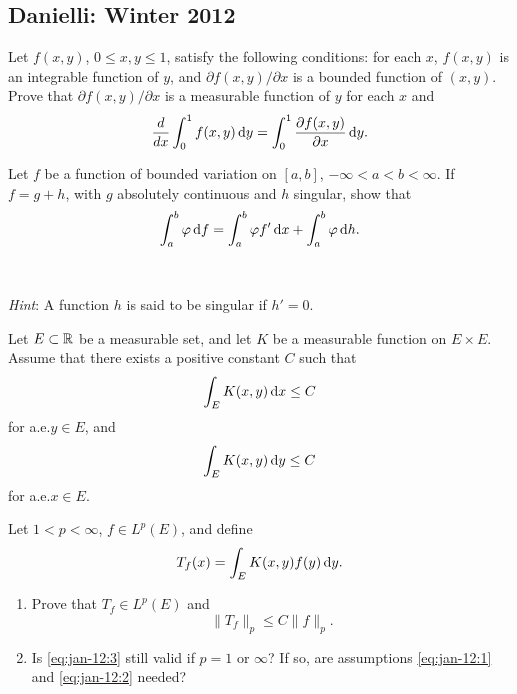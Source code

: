 \setcounter{exercise}{0}
\subsection{Danielli: Winter 2012}
\begin{problem}
Let $f(x,y)$, $0\leq x,y\leq 1$, satisfy the following conditions: for each
$x$, $f(x,y)$ is an integrable function of $y$, and $\partial
f(x,y)/\partial x$ is a bounded function of $(x,y)$. Prove that $\partial
f(x,y)/\partial x$ is a measurable function of $y$ for each $x$ and
\[
\frac{d}{dx}\int_0^1f(x,y)\mathop{}\!\mathrm{d} y=
\int_0^1\frac{\partial f(x,y)}{\partial x}\mathop{}\!\mathrm{d} y.
\]
\end{problem}
\begin{solution}
\end{solution}

\begin{problem}
Let $f$ be a function of bounded variation on $[a,b]$,
$-\infty<a<b<\infty$. If $f=g+h$, with $g$ absolutely continuous and $h$
singular, show that
\[
\int_a^b\varphi\mathop{}\!\mathrm{d} f=\int_a^b\varphi f'\mathop{}\!\mathrm{d} x+\int_a^b\varphi\mathop{}\!\mathrm{d} h.
\]
\\\\
\emph{Hint}: A function $h$ is said to be singular if $h'=0$.
\end{problem}
\begin{solution}
\end{solution}

\begin{problem}
Let $E\subset\mathbb{R}$ be a measurable set, and let $K$ be a measurable
function on $E\times E$. Assume that there exists a positive constant $C$
such that
\begin{equation}
\label{eq:jan-12:1}
\int_E K(x,y)\mathop{}\!\mathrm{d} x\leq C
\end{equation}
for a.e.\@ $y\in E$, and
\begin{equation}
\label{eq:jan-12:2}
\int_E K(x,y)\mathop{}\!\mathrm{d} y\leq C
\end{equation}
for a.e.\@ $x\in E$.

Let $1<p<\infty$, $f\in L^p(E)$, and define
\[
T_f(x)=\int_E K(x,y)f(y)\mathop{}\!\mathrm{d} y.
\]
\begin{enumerate}[label=(\alph*),noitemsep]
\item Prove that $T_f\in L^p(E)$ and
\begin{equation}
\label{eq:jan-12:3}
\|T_f\|_p\leq C\|f\|_p.
\end{equation}
\item Is \eqref{eq:jan-12:3} still valid if $p=1$ or $\infty$? If so, are
  assumptions \eqref{eq:jan-12:1} and \eqref{eq:jan-12:2} needed?
\end{enumerate}
\end{problem}
\begin{solution}
\end{solution}

